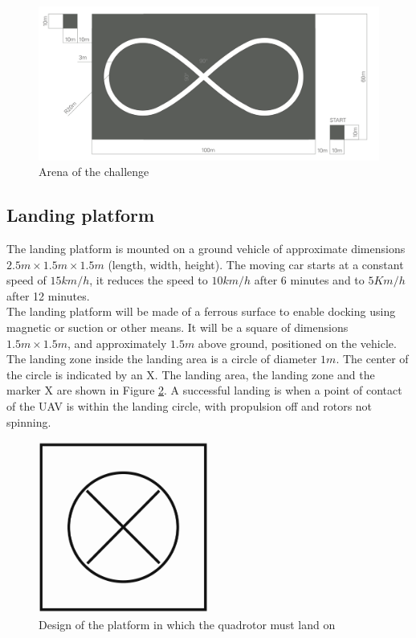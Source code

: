 \begin{figure}[!htbp]
    \centering
    \includegraphics[width=1.1\textwidth]{img/arena.png}
    \caption{Arena of the challenge}
    \label{fig:arenachallenge}
\end{figure}

\subsection{Landing platform}
The landing platform is mounted on a ground vehicle of approximate dimensions $2.5m \times 1.5m \times 1.5m$ (length, width, height). The moving car starts at a constant speed of $15km/h$, it reduces the speed to $10km/h$ after 6 minutes and to $5 Km/h$ after 12 minutes.\\
The landing platform will be made of a ferrous surface to enable docking using magnetic or suction or other means.
It will be a square of dimensions $1.5m \times 1.5m$, and approximately $1.5m$ above ground, positioned on the vehicle. 
The landing zone inside the landing area is a circle of diameter $1m$. The center of the circle is indicated by an X. The landing area, the landing zone and the marker X are shown in Figure \ref{fig:finalplatform}.
A successful landing is when a point of contact of the UAV is within the landing circle, with propulsion off and rotors not spinning.

\begin{figure}[!htbp]
    \centering
    \includegraphics[width=0.5\textwidth]{img/base.pdf}
    \caption{Design of the platform in which the quadrotor must land on}
    \label{fig:finalplatform}
\end{figure}


